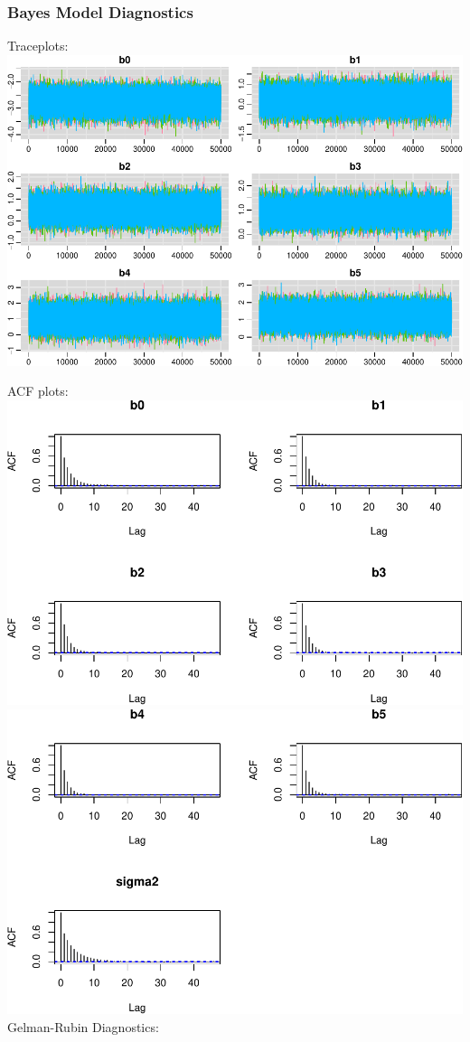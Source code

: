 \documentclass[
]{article}
\begin{document}
\hypertarget{bayes-model-diagnostics}{%
\subsubsection{Bayes Model Diagnostics}\label{bayes-model-diagnostics}}

Traceplots:
\includegraphics{final_report_files/figure-latex/trace-1.pdf}

ACF plots:\\
\includegraphics{final_report_files/figure-latex/acf-1.pdf}
\includegraphics{final_report_files/figure-latex/acf-2.pdf} Gelman-Rubin
Diagnostics:
\end{document}
